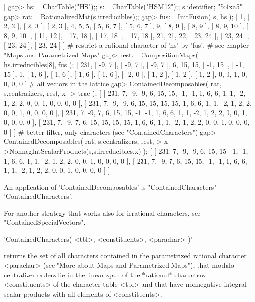 |    gap> hs:= CharTable("HS");; s:= CharTable("HSM12");; s.identifier;
    "5:4xa5"
    gap> rat:= RationalizedMat(s.irreducibles);;
    gap> fus:= InitFusion( s, hs );
    [ 1, [ 2, 3 ], [ 2, 3 ], [ 2, 3 ], 4, 5, 5, [ 5, 6, 7 ], [ 5, 6, 7 ],
      9, [ 8, 9 ], [ 8, 9 ], [ 8, 9, 10 ], [ 8, 9, 10 ], [ 11, 12 ],
      [ 17, 18 ], [ 17, 18 ], [ 17, 18 ], 21, 21, 22, [ 23, 24 ],
      [ 23, 24 ], [ 23, 24 ], [ 23, 24 ] ]
    # restrict a rational character of 'hs' by 'fus',
    # see chapter "Maps and Parametrized Maps"\:
    gap> rest:= CompositionMaps( hs.irreducibles[8], fus );
    [ 231, [ -9, 7 ], [ -9, 7 ], [ -9, 7 ], 6, 15, 15, [ -1, 15 ],
      [ -1, 15 ], 1, [ 1, 6 ], [ 1, 6 ], [ 1, 6 ], [ 1, 6 ], [ -2, 0 ],
      [ 1, 2 ], [ 1, 2 ], [ 1, 2 ], 0, 0, 1, 0, 0, 0, 0 ]
    # all vectors in the lattice\:
    gap> ContainedDecomposables( rat, s.centralizers, rest, x -> true );
    [ [ 231, 7, -9, -9, 6, 15, 15, -1, -1, 1, 6, 6, 1, 1, -2, 1, 2, 2, 0,
          0, 1, 0, 0, 0, 0 ],
      [ 231, 7, -9, -9, 6, 15, 15, 15, 15, 1, 6, 6, 1, 1, -2, 1, 2, 2, 0,
          0, 1, 0, 0, 0, 0 ],
      [ 231, 7, -9, 7, 6, 15, 15, -1, -1, 1, 6, 6, 1, 1, -2, 1, 2, 2, 0,
          0, 1, 0, 0, 0, 0 ],
      [ 231, 7, -9, 7, 6, 15, 15, 15, 15, 1, 6, 6, 1, 1, -2, 1, 2, 2, 0,
          0, 1, 0, 0, 0, 0 ] ]
    # better filter, only characters (see "ContainedCharacters")\:
    gap> ContainedDecomposables( rat, s.centralizers, rest,
    >                  x->NonnegIntScalarProducts(s,s.irreducibles,x) );
    [ [ 231, 7, -9, -9, 6, 15, 15, -1, -1, 1, 6, 6, 1, 1, -2, 1, 2, 2, 0,
          0, 1, 0, 0, 0, 0 ],
      [ 231, 7, -9, 7, 6, 15, 15, -1, -1, 1, 6, 6, 1, 1, -2, 1, 2, 2, 0,
          0, 1, 0, 0, 0, 0 ] ]|

An  application    of  'ContainedDecomposables' is  "ContainedCharacters"
'ContainedCharacters'.

For another  strategy  that works  also  for  irrational characters,  see
"ContainedSpecialVectors".


'ContainedCharacters( <tbl>, <constituents>, <parachar> )'

returns the set of all characters contained  in the parametrized rational
character <parachar> (see "More about Maps  and Parametrized Maps"), that
modulo centralizer orders  lie   in the linear  span  of  the  *rational*
characters  <constituents>  of the character   table <tbl>  and that have
nonnegative integral scalar products with all elements of <constituents>.

